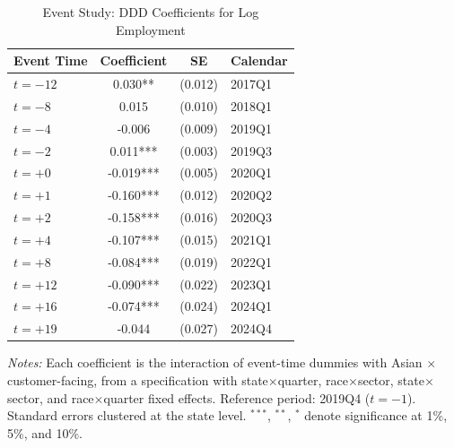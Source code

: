 \begin{table}[t]
\centering
\caption{Event Study: DDD Coefficients for Log Employment}
\label{tab:event_study}
\small
\begin{threeparttable}
\begin{tabular}{lccl}
\toprule
Event Time & Coefficient & SE & Calendar \\
\midrule
$t = -12$ & 0.030** & (0.012) & 2017Q1 \\
$t = -8$ & 0.015 & (0.010) & 2018Q1 \\
$t = -4$ & -0.006 & (0.009) & 2019Q1 \\
$t = -2$ & 0.011*** & (0.003) & 2019Q3 \\
$t = +0$ & -0.019*** & (0.005) & 2020Q1 \\
$t = +1$ & -0.160*** & (0.012) & 2020Q2 \\
$t = +2$ & -0.158*** & (0.016) & 2020Q3 \\
$t = +4$ & -0.107*** & (0.015) & 2021Q1 \\
$t = +8$ & -0.084*** & (0.019) & 2022Q1 \\
$t = +12$ & -0.090*** & (0.022) & 2023Q1 \\
$t = +16$ & -0.074*** & (0.024) & 2024Q1 \\
$t = +19$ & -0.044 & (0.027) & 2024Q4 \\
\bottomrule
\end{tabular}
\begin{tablenotes}\small
\item \textit{Notes:} Each coefficient is the interaction of event-time dummies with Asian $\times$ customer-facing, from a specification with state$\times$quarter, race$\times$sector, state$\times$sector, and race$\times$quarter fixed effects. Reference period: 2019Q4 ($t = -1$). Standard errors clustered at the state level. $^{***}$, $^{**}$, $^{*}$ denote significance at 1\%, 5\%, and 10\%.
\end{tablenotes}
\end{threeparttable}
\end{table}
